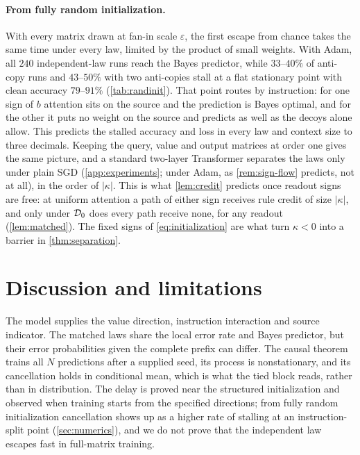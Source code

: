 \paragraph{From fully random initialization.} With every matrix drawn at fan-in scale $\varepsilon$, the first escape from chance takes the same time under
every law, limited by the product of small weights. With Adam, all
$240$ independent-law runs reach the Bayes predictor, while $33$--$40\%$ of anti-copy runs and $43$--$50\%$ with two anti-copies stall at a flat stationary point
with clean accuracy $79$--$91\%$ (\cref{tab:randinit}). That point routes by instruction: for one sign of $b$ attention sits on the source and the prediction is Bayes
optimal, and for the other it puts no weight on the source and predicts as well as the decoys alone allow. This predicts the stalled accuracy and loss in every
law and context size to three decimals. Keeping the query, value and output matrices at order one gives the same picture, and a standard two-layer
Transformer separates the laws only under plain SGD (\cref{app:experiments}; under Adam, as \cref{rem:sign-flow} predicts, not at all), in the order of $|\kappa|$. This is what \cref{lem:credit} predicts once readout signs are free: at
uniform attention a path of either sign receives rule credit of size $|\kappa|$, and only under $\mathcal D_{0}$ does every path receive none, for any readout (\cref{lem:matched}).
The fixed signs of \cref{eq:initialization} are what turn $\kappa<0$ into a barrier in \cref{thm:separation}.

\section{Discussion and limitations}
\label{sec:scope}
The model supplies the value direction, instruction interaction and source indicator. The matched laws share the local error rate and Bayes predictor, but their error probabilities given the complete prefix can differ.
The causal theorem trains all $N$ predictions after a supplied seed, its process is nonstationary, and its cancellation holds in conditional mean,
which is what the tied block reads, rather than in distribution.
The delay is proved near the structured initialization and observed when training starts from the specified directions; from fully random initialization
cancellation shows up as a higher rate of stalling at an instruction-split point (\cref{sec:numerics}), and we do not prove that the independent law escapes fast in full-matrix training.

